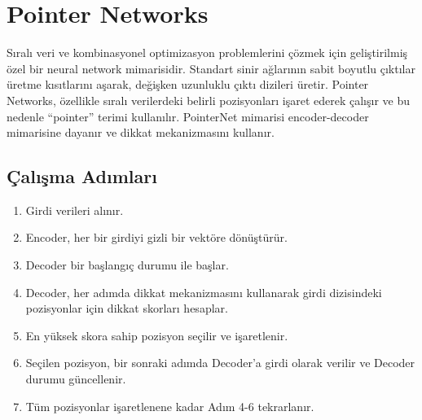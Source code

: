 \section{Pointer Networks}
Sıralı veri ve kombinasyonel optimizasyon problemlerini çözmek için geliştirilmiş özel bir neural network mimarisidir. Standart sinir ağlarının sabit boyutlu çıktılar üretme kısıtlarını aşarak, değişken uzunluklu çıktı dizileri üretir. Pointer Networks, özellikle sıralı verilerdeki belirli pozisyonları işaret ederek çalışır ve bu nedenle ``pointer'' terimi kullanılır. PointerNet mimarisi encoder-decoder mimarisine dayanır ve dikkat mekanizmasını kullanır.

\subsection{Çalışma Adımları}
\begin{enumerate}
	\item Girdi verileri alınır.
	\item Encoder, her bir girdiyi gizli bir vektöre dönüştürür.
	\item Decoder bir başlangıç durumu ile başlar.
	\item Decoder, her adımda dikkat mekanizmasını kullanarak girdi dizisindeki pozisyonlar için dikkat skorları hesaplar.
	\item En yüksek skora sahip pozisyon seçilir ve işaretlenir.
	\item Seçilen pozisyon, bir sonraki adımda Decoder'a girdi olarak verilir ve Decoder durumu güncellenir.
	\item Tüm pozisyonlar işaretlenene kadar Adım 4-6 tekrarlanır.
\end{enumerate}

\newpage
